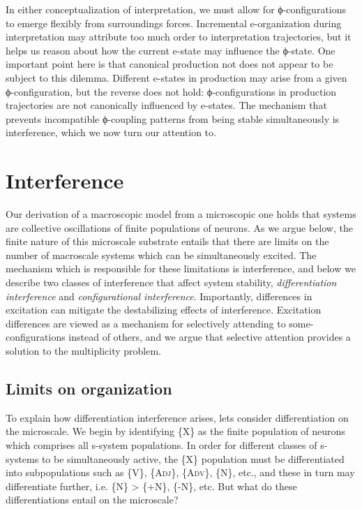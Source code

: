   In either conceptualization of interpretation, we must allow for ϕ-configurations to emerge flexibly from surroundings forces. Incremental e-organization during interpretation may attribute too much order to interpretation trajectories, but it helps us reason about how the current e-state may influence the ϕ-state. One important point here is that canonical production not does not appear to be subject to this dilemma. Different e-states in production may arise from a given ϕ-configuration, but the reverse does not hold: ϕ-configurations in production trajectories are not canonically influenced by e-states. The mechanism that prevents incompatible ϕ-coupling patterns from being stable simultaneously is interference, which we now turn our attention to.

\section{Interference}

Our derivation of a macroscopic model from a microscopic one holds that systems are collective oscillations of finite populations of neurons. As we argue below, the finite nature of this microscale substrate entails that there are limits on the number of macroscale systems which can be simultaneously excited. The mechanism which is responsible for these limitations is interference, and below we describe two classes of interference that affect system stability, \textit{differentiation interference} and \textit{configurational interference}. Importantly, differences in excitation can mitigate the destabilizing effects of interference. Excitation differences are viewed as a mechanism for selectively attending to some-configurations instead of others, and we argue that selective attention provides a solution to the multiplicity problem.

\subsection{Limits on organization}

To explain how differentiation interference arises, lets consider differentiation on the microscale. We begin by identifying \{X\} as the finite population of neurons which comprises all s-system populations. In order for different classes of s-systems to be simultaneously active, the \{X\} population must be differentiated into subpopulations such as \{V\}, \{A\textsc{dj}\}, \{A\textsc{dv}\}, \{N\}, etc., and these in turn may differentiate further, i.e. \{N\} > \{+N\}, \{-N\}, etc. But what do these differentiations entail on the microscale?

